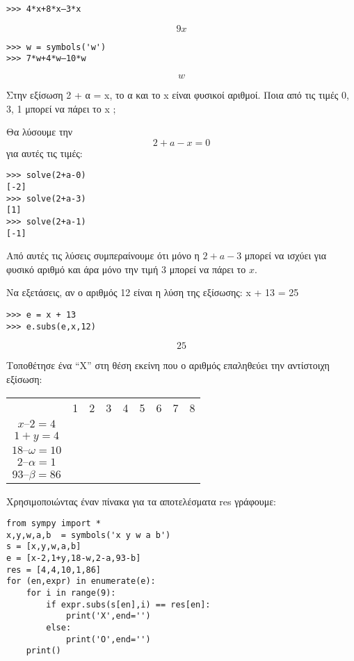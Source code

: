 \begin{lstlisting}
>>> 4*x+8*x–3*x 
\end{lstlisting}

$$9x$$

\begin{lstlisting}
>>> w = symbols('w')
>>> 7*w+4*w–10*w
\end{lstlisting}

$$w$$

\begin{exercise}
Στην εξίσωση 2 + α = x, το α και το x είναι φυσικοί αριθμοί. Ποια από τις τιμές
0, 3, 1 μπορεί να πάρει το x ;
\end{exercise}
Θα λύσουμε την $$2+a-x=0$$ για αυτές τις τιμές:
\begin{lstlisting}
>>> solve(2+a-0)
[-2]
>>> solve(2+a-3)
[1]
>>> solve(2+a-1)
[-1]
\end{lstlisting}
Από αυτές τις λύσεις συμπεραίνουμε ότι μόνο η $2+a-3$ μπορεί να ισχύει για φυσικό αριθμό και άρα μόνο την τιμή $3$ μπορεί να πάρει το $x$.
\begin{exercise}
Να εξετάσεις, αν ο αριθμός 12 είναι η λύση της εξίσωσης: x + 13 = 25
\end{exercise}
\begin{lstlisting}
>>> e = x + 13
>>> e.subs(e,x,12)
\end{lstlisting}
$$25$$
\begin{exercise}
Τοποθέτησε ένα “Χ” στη θέση εκείνη που ο αριθμός επαληθεύει την αντίστοιχη εξίσωση:

\begin{tabular}{|c|c|c|c|c|c|c|c|c|}
&1&2&3&4&5&6&7&8\\
$x – 2 = 4$&&&&&&&&\\
$1 + y = 4$&&&&&&&&\\
$18 – \omega = 10$&&&&&&&&\\
$2 – \alpha = 1$&&&&&&&&\\
$93 – \beta = 86$&&&&&&&&\\
\end{tabular}
\end{exercise}
Χρησιμοποιώντας έναν πίνακα για τα αποτελέσματα res γράφουμε:
\begin{lstlisting}
from sympy import *
x,y,w,a,b  = symbols('x y w a b')
s = [x,y,w,a,b]
e = [x-2,1+y,18-w,2-a,93-b]
res = [4,4,10,1,86]
for (en,expr) in enumerate(e):
    for i in range(9):
        if expr.subs(s[en],i) == res[en]:
            print('X',end='')
        else:
            print('O',end='')
    print()
\end{lstlisting}
